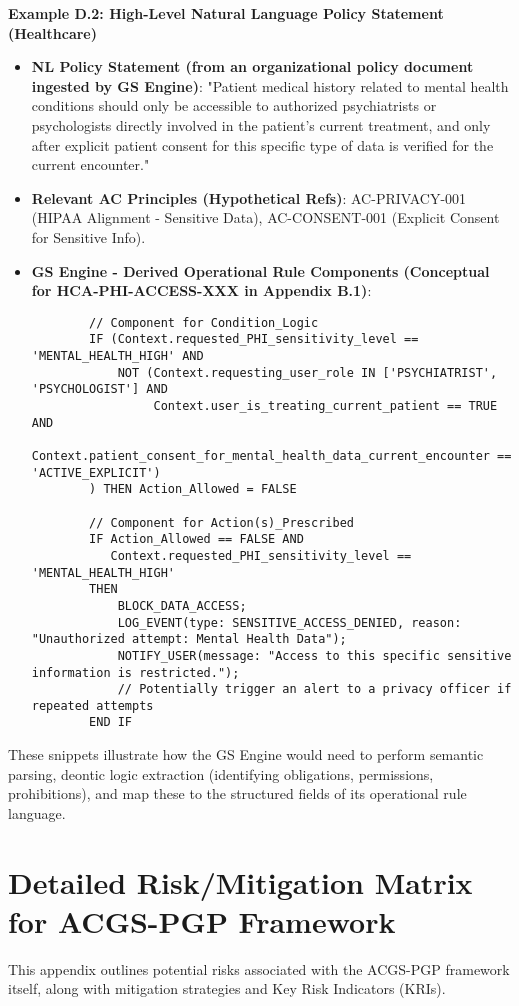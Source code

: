 \documentclass[sigconf,review,anonymous=false]{acmart} %
\begin{document}
\textbf{Example D.2: High-Level Natural Language Policy Statement (Healthcare)}
\begin{itemize}
    \item \textbf{NL Policy Statement (from an organizational policy document ingested by GS Engine)}: "Patient medical history related to mental health conditions should only be accessible to authorized psychiatrists or psychologists directly involved in the patient's current treatment, and only after explicit patient consent for this specific type of data is verified for the current encounter."
    \item \textbf{Relevant AC Principles (Hypothetical Refs)}: AC-PRIVACY-001 (HIPAA Alignment - Sensitive Data), AC-CONSENT-001 (Explicit Consent for Sensitive Info).
    \item \textbf{GS Engine - Derived Operational Rule Components (Conceptual for HCA-PHI-ACCESS-XXX in Appendix B.1)}:
        \begin{verbatim}
        // Component for Condition_Logic
        IF (Context.requested_PHI_sensitivity_level == 'MENTAL_HEALTH_HIGH' AND
            NOT (Context.requesting_user_role IN ['PSYCHIATRIST', 'PSYCHOLOGIST'] AND
                 Context.user_is_treating_current_patient == TRUE AND
                 Context.patient_consent_for_mental_health_data_current_encounter == 'ACTIVE_EXPLICIT')
        ) THEN Action_Allowed = FALSE

        // Component for Action(s)_Prescribed
        IF Action_Allowed == FALSE AND
           Context.requested_PHI_sensitivity_level == 'MENTAL_HEALTH_HIGH'
        THEN
            BLOCK_DATA_ACCESS;
            LOG_EVENT(type: SENSITIVE_ACCESS_DENIED, reason: "Unauthorized attempt: Mental Health Data");
            NOTIFY_USER(message: "Access to this specific sensitive information is restricted.");
            // Potentially trigger an alert to a privacy officer if repeated attempts
        END IF
        \end{verbatim}
\end{itemize}
These snippets illustrate how the GS Engine would need to perform semantic parsing, deontic logic extraction (identifying obligations, permissions, prohibitions), and map these to the structured fields of its operational rule language.

\section{Detailed Risk/Mitigation Matrix for ACGS-PGP Framework}
\label{app:risk_matrix}
This appendix outlines potential risks associated with the ACGS-PGP framework itself, along with mitigation strategies and Key Risk Indicators (KRIs).
\end{document}
